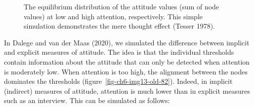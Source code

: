 \documentclass[
  a4paper,
  DIV=11,
  numbers=noendperiod,
  oneside]{scrreprt}
\begin{document}
\begin{figure}


\caption{\label{fig-ch6-img12-old-81}The equilibrium distribution of the
attitude values (sum of node values) at low and high attention,
respectively. This simple simulation demonstrates the mere thought
effect (Tesser 1978).}

\end{figure}%

In Dalege and van der Maas (2020), we simulated the difference between
implicit and explicit measures of attitude. The idea is that the
individual thresholds contain information about the attitude that can
only be detected when attention is moderately low. When attention is too
high, the alignment between the nodes dominates the thresholds
(figure~\ref{fig-ch6-img13-old-82}). Indeed, in implicit (indirect)
measures of attitude, attention is much lower than in explicit measures
such as an interview. This can be simulated as follows:
\end{document}
